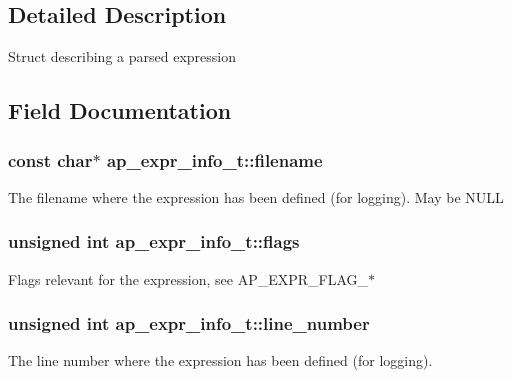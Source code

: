\subsection{Detailed Description}
Struct describing a parsed expression 

\subsection{Field Documentation}
\subsubsection[{\texorpdfstring{filename}{filename}}]{\setlength{\rightskip}{0pt plus 5cm}const char$\ast$ ap\+\_\+expr\+\_\+info\+\_\+t\+::filename}\hypertarget{structap__expr__info__t_aef6debc56a84a98cf8e971af5ed2c6e5}{}\label{structap__expr__info__t_aef6debc56a84a98cf8e971af5ed2c6e5}
The filename where the expression has been defined (for logging). May be N\+U\+LL 
\subsubsection[{\texorpdfstring{flags}{flags}}]{\setlength{\rightskip}{0pt plus 5cm}unsigned {\bf int} ap\+\_\+expr\+\_\+info\+\_\+t\+::flags}\hypertarget{structap__expr__info__t_a3975379515d9232a69b4f8cc7590e89a}{}\label{structap__expr__info__t_a3975379515d9232a69b4f8cc7590e89a}
Flags relevant for the expression, see A\+P\+\_\+\+E\+X\+P\+R\+\_\+\+F\+L\+A\+G\+\_\+$\ast$ 
\subsubsection[{\texorpdfstring{line\+\_\+number}{line_number}}]{\setlength{\rightskip}{0pt plus 5cm}unsigned {\bf int} ap\+\_\+expr\+\_\+info\+\_\+t\+::line\+\_\+number}\hypertarget{structap__expr__info__t_a31130ccb91b53db455b664353691e7b9}{}\label{structap__expr__info__t_a31130ccb91b53db455b664353691e7b9}
The line number where the expression has been defined (for logging). 

